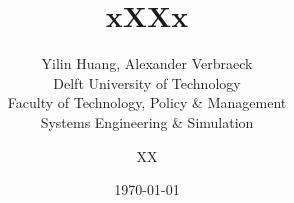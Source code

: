 \documentclass[a4paper]{article}
\begin{document}
\title{xXXx}

\author{Yilin Huang, Alexander Verbraeck\\
	 Delft University of Technology\\
	 Faculty of Technology, Policy \& Management\\
	 Systems Engineering \& Simulation \\
	\and 
	XX
	}

\date{\today}


%



\maketitle
\begin{abstract}
	
\end{abstract}


\saythanks






\renewcommand{\bibfont}{\small}
\printbibliography
\end{document}
